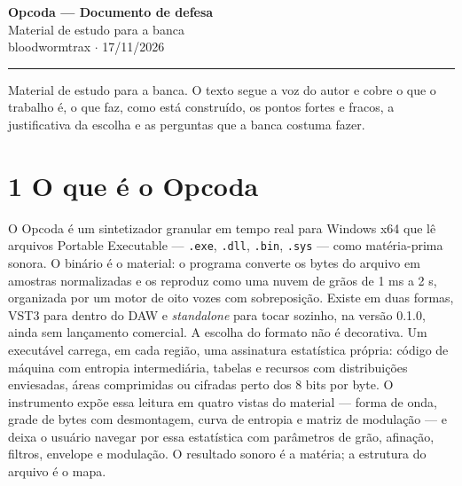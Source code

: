 \documentclass[11pt,a4paper]{article}
\newcommand{\code}[1]{\texttt{\small #1}}
\begin{document}
\begin{center}
{\LARGE\bfseries Opcoda --- Documento de defesa}\\[4pt]
{\large Material de estudo para a banca}\\[2pt]
{\small bloodwormtrax $\cdot$ 17/11/2026}
\end{center}

\vspace{6pt}
\hrule
\vspace{10pt}

Material de estudo para a banca. O texto segue a voz do autor e cobre o que o trabalho é, o que faz, como está construído, os pontos fortes e fracos, a justificativa da escolha e as perguntas que a banca costuma fazer.

\section*{1 O que é o Opcoda}
O Opcoda é um sintetizador granular em tempo real para Windows x64 que lê arquivos Portable Executable --- \code{.exe}, \code{.dll}, \code{.bin}, \code{.sys} --- como matéria-prima sonora. O binário é o material: o programa converte os bytes do arquivo em amostras normalizadas e os reproduz como uma nuvem de grãos de 1 ms a 2 s, organizada por um motor de oito vozes com sobreposição. Existe em duas formas, VST3 para dentro do DAW e \emph{standalone} para tocar sozinho, na versão 0.1.0, ainda sem lançamento comercial. A escolha do formato não é decorativa. Um executável carrega, em cada região, uma assinatura estatística própria: código de máquina com entropia intermediária, tabelas e recursos com distribuições enviesadas, áreas comprimidas ou cifradas perto dos 8 bits por byte. O instrumento expõe essa leitura em quatro vistas do material --- forma de onda, grade de bytes com desmontagem, curva de entropia e matriz de modulação --- e deixa o usuário navegar por essa estatística com parâmetros de grão, afinação, filtros, envelope e modulação. O resultado sonoro é a matéria; a estrutura do arquivo é o mapa.
\end{document}
